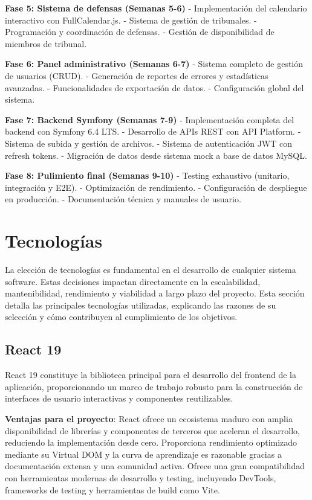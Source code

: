 \documentclass[12pt,a4paper,oneside]{report}
\begin{document}
\textbf{Fase 5: Sistema de defensas (Semanas 5-6)} - Implementación del
calendario interactivo con FullCalendar.js. - Sistema de gestión de
tribunales. - Programación y coordinación de defensas. - Gestión de
disponibilidad de miembros de tribunal.

\textbf{Fase 6: Panel administrativo (Semanas 6-7)} - Sistema completo
de gestión de usuarios (CRUD). - Generación de reportes de errores y estadísticas
avanzadas. - Funcionalidades de exportación de datos. - Configuración
global del sistema.

\textbf{Fase 7: Backend Symfony (Semanas 7-9)} - Implementación completa
del backend con Symfony 6.4 LTS. - Desarrollo de APIs REST con API
Platform. - Sistema de subida y gestión de archivos. - Sistema de autenticación JWT con refresh tokens. - Migración
de datos desde sistema mock a base de datos MySQL.

\textbf{Fase 8: Pulimiento final (Semanas 9-10)} - Testing exhaustivo
(unitario, integración y E2E). - Optimización de rendimiento. -
Configuración de despliegue en producción. - Documentación técnica y
manuales de usuario.

\section{Tecnologías}\label{tecnologuxedas}

La elección de tecnologías es fundamental en el desarrollo de cualquier sistema software. Estas decisiones impactan directamente en la escalabilidad, mantenibilidad, rendimiento y viabilidad a largo plazo del proyecto. Esta sección detalla las principales tecnologías utilizadas, explicando las razones de su selección y cómo contribuyen al cumplimiento de los objetivos.

\subsection{React 19}\label{react-19}

React 19 constituye la biblioteca principal para el desarrollo del
frontend de la aplicación, proporcionando un marco de trabajo robusto
para la construcción de interfaces de usuario interactivas y componentes
reutilizables.

\textbf{Ventajas para el proyecto}: React ofrece un ecosistema maduro con amplia disponibilidad de librerías y componentes de terceros que aceleran el desarrollo, reduciendo la implementación desde cero. Proporciona rendimiento optimizado mediante su Virtual DOM y la curva de aprendizaje es razonable gracias a documentación extensa y una comunidad activa. Ofrece una gran compatibilidad con herramientas modernas de desarrollo y testing, incluyendo DevTools, frameworks de testing y herramientas de build como Vite.
\end{document}
